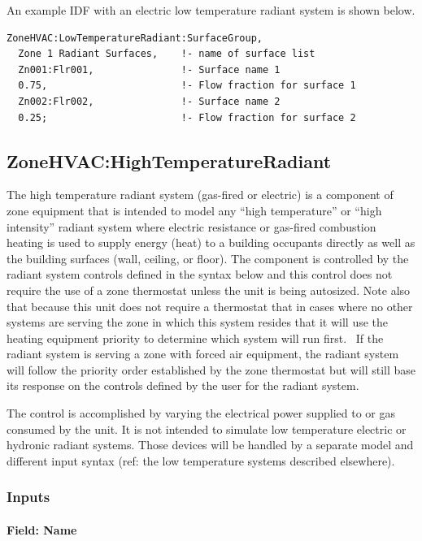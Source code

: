 An example IDF with an electric low temperature radiant system is shown below.

\begin{lstlisting}
ZoneHVAC:LowTemperatureRadiant:SurfaceGroup,
  Zone 1 Radiant Surfaces,    !- name of surface list
  Zn001:Flr001,               !- Surface name 1
  0.75,                       !- Flow fraction for surface 1
  Zn002:Flr002,               !- Surface name 2
  0.25;                       !- Flow fraction for surface 2
\end{lstlisting}

\subsection{ZoneHVAC:HighTemperatureRadiant}\label{zonehvachightemperatureradiant}

The high temperature radiant system (gas-fired or electric) is a component of zone equipment that is intended to model any ``high temperature'' or ``high intensity'' radiant system where electric resistance or gas-fired combustion heating is used to supply energy (heat) to a building occupants directly as well as the building surfaces (wall, ceiling, or floor). The component is controlled by the radiant system controls defined in the syntax below and this control does not require the use of a zone thermostat unless the unit is being autosized. Note also that because this unit does not require a thermostat that in cases where no other systems are serving the zone in which this system resides that it will use the heating equipment priority to determine which system will run first.~ If the radiant system is serving a zone with forced air equipment, the radiant system will follow the priority order established by the zone thermostat but will still base its response on the controls defined by the user for the radiant system.

The control is accomplished by varying the electrical power supplied to or gas consumed by the unit. It is not intended to simulate low temperature electric or hydronic radiant systems. Those devices will be handled by a separate model and different input syntax (ref: the low temperature systems described elsewhere).

\subsubsection{Inputs}\label{inputs-9-015}

\paragraph{Field: Name}\label{field-name-9-013}

